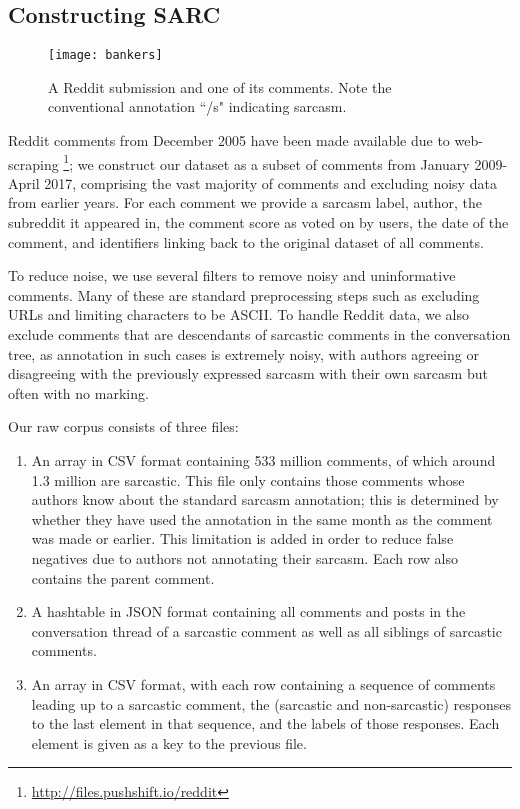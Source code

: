 \documentclass[10pt, a4paper]{article}
\begin{document}
\subsection{Constructing SARC}
\label{subsec:sarc}

\begin{figure}
	\centering
	\texttt{[image: bankers]}
	\caption{\label{fig:example}
A Reddit submission and one of its comments.
Note the conventional annotation ``/s" indicating sarcasm.}
\end{figure}

Reddit comments from December 2005 have been made available due to web-scraping \footnote{\url{http://files.pushshift.io/reddit}};
we construct our dataset as a subset of comments from January 2009-April 2017, comprising the vast majority of comments and excluding noisy data from earlier years.
For each comment we provide a sarcasm label, author, the subreddit it appeared in, the comment score as voted on by users, the date of the comment, and identifiers linking back to the original dataset of all comments.

To reduce noise, we use several filters to remove noisy and uninformative comments.
Many of these are standard preprocessing steps such as excluding URLs and limiting characters to be ASCII.
To handle Reddit data, we also exclude comments that are descendants of sarcastic comments in the conversation tree, as annotation in such cases is extremely noisy, with authors agreeing or disagreeing with the previously expressed sarcasm with their own sarcasm but often with no marking.

Our raw corpus consists of three files:
\begin{enumerate}
	\item An array in CSV format containing 533 million comments, of which around 1.3 million are sarcastic. This file only contains those comments whose authors know about the standard sarcasm annotation; this is determined by whether they have used the annotation in the same month as the comment was made or earlier. This limitation is added in order to reduce false negatives due to authors not annotating their sarcasm. Each row also contains the parent comment.
	\item A hashtable in JSON format containing all comments and posts in the conversation thread of a sarcastic comment as well as all siblings of sarcastic comments.
	\item An array in CSV format, with each row containing a sequence of comments leading up to a sarcastic comment, the (sarcastic and non-sarcastic) responses to the last element in that sequence, and the labels of those responses. Each element is given as a key to the previous file.
\end{enumerate}
\end{document}
